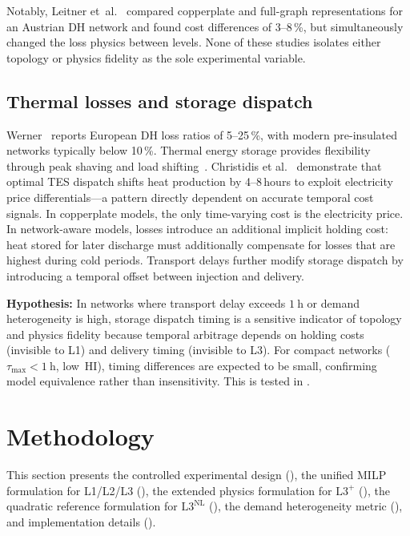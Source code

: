 \documentclass[review,3p]{elsarticle}
\newcommand{\Lplus}{\mathrm{L3}^{+}}
\newcommand{\Lnl}{\mathrm{L3}^{\mathrm{NL}}}
\begin{document}
Notably, Leitner et~al.~\cite{Leitner2019} compared copperplate and
full-graph representations for an Austrian DH network and found cost
differences of 3--8\,\%, but simultaneously changed the loss physics
between levels. None of these studies isolates either topology or
physics fidelity as the sole experimental variable.

\subsection{Thermal losses and storage dispatch}
\label{sec:rw_losses_storage}

Werner~\cite{Werner2017} reports European DH loss ratios of 5--25\,\%,
with modern pre-insulated networks typically below 10\,\%. Thermal
energy storage provides flexibility through peak shaving and load
shifting~\cite{Vandermeulen2018,Guelpa2019review}. Christidis et
al.~\cite{Christidis2017} demonstrate that optimal TES dispatch shifts
heat production by 4--8\,hours to exploit electricity price
differentials---a pattern directly dependent on accurate temporal cost
signals. In copperplate models, the only time-varying cost is the
electricity price. In network-aware models, losses introduce an
additional implicit holding cost: heat stored for later discharge must
additionally compensate for losses that are highest during cold
periods. Transport delays further modify storage dispatch by
introducing a temporal offset between injection and delivery.

\textbf{Hypothesis:} In networks where transport delay exceeds
$\SI{1}{\hour}$ or demand heterogeneity is high, storage dispatch
timing is a sensitive indicator of topology and physics fidelity
because temporal arbitrage depends on holding costs (invisible to L1)
and delivery timing (invisible to L3). For compact networks
($\tau_{\max} < \SI{1}{\hour}$, low~HI), timing differences are
expected to be small, confirming model equivalence rather than
insensitivity. This is tested in .

\section{Methodology}
\label{sec:methodology}

This section presents the controlled experimental design
(), the unified MILP formulation for L1/L2/L3
(), the extended physics formulation for $\Lplus$
(), the quadratic reference formulation for
$\Lnl$ (), the demand heterogeneity metric
(), and implementation details
().
\end{document}
